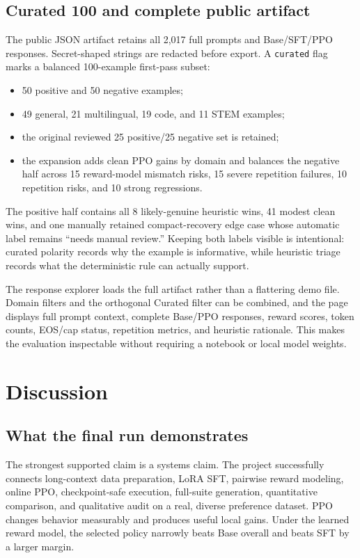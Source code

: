 \documentclass[11pt]{article}
\begin{document}
\subsection{Curated 100 and complete public artifact}

The public JSON artifact retains all 2,017 full prompts and Base/SFT/PPO
responses. Secret-shaped strings are redacted before export. A \texttt{curated}
flag marks a balanced 100-example first-pass subset:

\begin{itemize}
  \item 50 positive and 50 negative examples;
  \item 49 general, 21 multilingual, 19 code, and 11 STEM examples;
  \item the original reviewed 25 positive/25 negative set is retained;
  \item the expansion adds clean PPO gains by domain and balances the negative
  half across 15 reward-model mismatch risks, 15 severe repetition failures,
  10 repetition risks, and 10 strong regressions.
\end{itemize}

The positive half contains all 8 likely-genuine heuristic wins, 41 modest
clean wins, and one manually retained compact-recovery edge case whose
automatic label remains ``needs manual review.'' Keeping both labels visible
is intentional: curated polarity records why the example is informative,
while heuristic triage records what the deterministic rule can actually
support.

The response explorer loads the full artifact rather than a flattering demo
file. Domain filters and the orthogonal Curated filter can be combined, and
the page displays full prompt context, complete Base/PPO responses, reward
scores, token counts, EOS/cap status, repetition metrics, and heuristic
rationale. This makes the evaluation inspectable without requiring a notebook
or local model weights.

\section{Discussion}

\subsection{What the final run demonstrates}

The strongest supported claim is a systems claim. The project successfully
connects long-context data preparation, LoRA SFT, pairwise reward modeling,
online PPO, checkpoint-safe execution, full-suite generation, quantitative
comparison, and qualitative audit on a real, diverse preference dataset. PPO
changes behavior measurably and produces useful local gains. Under the learned
reward model, the selected policy narrowly beats Base overall and beats SFT by
a larger margin.
\end{document}
